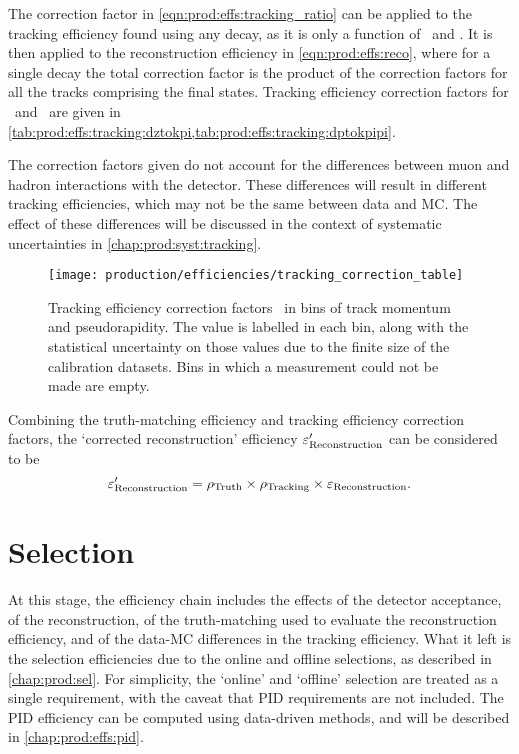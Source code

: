 The correction factor in \cref{eqn:prod:effs:tracking_ratio} can be applied to 
the tracking efficiency found using any decay, as it is only a function of 
\ptot\ and \Eta.
It is then applied to the reconstruction efficiency in 
\cref{eqn:prod:effs:reco}, where for a single decay the total correction factor 
is the product of the correction factors for all the tracks comprising the 
final states.
Tracking efficiency correction factors for \DzToKpi\ and \DpToKpipi\ are given 
in \cref{tab:prod:effs:tracking:dztokpi,tab:prod:effs:tracking:dptokpipi}.

The correction factors given do not account for the differences between muon 
and hadron interactions with the detector.
These differences will result in different tracking efficiencies, which may not 
be the same between data and \ac{MC}.
The effect of these differences will be discussed in the context of systematic 
uncertainties in \cref{chap:prod:syst:tracking}.

\begin{figure}
  \centering
  \texttt{[image: production/efficiencies/tracking\_correction\_table]}
  \caption{%
    Tracking efficiency correction factors \efftracking\ in bins of track 
    momentum and pseudorapidity.
    The value is labelled in each bin, along with the statistical uncertainty 
    on those values due to the finite size of the calibration datasets.
    Bins in which a measurement could not be made are empty.
  }
  \label{fig:prod:effs:tracking_table}
\end{figure}

Combining the truth-matching efficiency and tracking efficiency correction 
factors, the `corrected reconstruction' efficiency $\varepsilon_{\textnormal{Reconstruction}}'$ can be 
considered to be
\begin{equation}
  \varepsilon_{\textnormal{Reconstruction}}' = \rho_{\textnormal{Truth}}\times\rho_{\textnormal{Tracking}}\times\varepsilon_{\textnormal{Reconstruction}}.
  \label{eqn:prod:effs:reco_corrected}
\end{equation}

\section{Selection}
\label{chap:prod:effs:sel}

At this stage, the efficiency chain includes the effects of the detector 
acceptance, of the reconstruction, of the truth-matching used to evaluate the 
reconstruction efficiency, and of the data-\ac{MC} differences in the tracking 
efficiency.
What it left is the selection efficiencies due to the online and offline 
selections, as described in \cref{chap:prod:sel}.
For simplicity, the `online' and `offline' selection are treated as a single 
requirement, with the caveat that \ac{PID} requirements are not included.
The \ac{PID} efficiency can be computed using data-driven methods, and will be 
described in \cref{chap:prod:effs:pid}.

